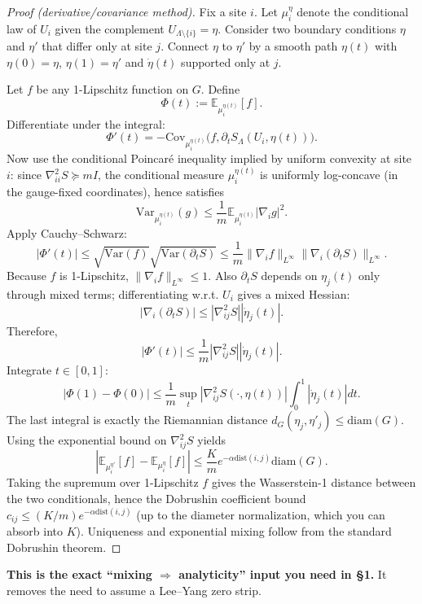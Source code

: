 \begin{proof}[Proof (derivative/covariance method)]
Fix a site $i$. Let $\mu_i^{\eta}$ denote the conditional law of $U_i$ given the complement $U_{\Lambda\setminus\{i\}}=\eta$. Consider two boundary conditions $\eta$ and $\eta'$ that differ only at site $j$. Connect $\eta$ to $\eta'$ by a smooth path $\eta(t)$ with $\eta(0)=\eta$, $\eta(1)=\eta'$ and $\dot\eta(t)$ supported only at $j$.

Let $f$ be any 1-Lipschitz function on $G$. Define
\[
\Phi(t) := \mathbb E_{\mu_i^{\eta(t)}}[f].
\]
Differentiate under the integral:
\[
\Phi'(t) = -\mathrm{Cov}_{\mu_i^{\eta(t)}}\big(f,\partial_t S_\Lambda(U_i,\eta(t))\big).
\]
Now use the conditional Poincaré inequality implied by uniform convexity at site $i$: since $\nabla^2_{ii}S \succeq m I$, the conditional measure $\mu_i^{\eta(t)}$ is uniformly log-concave (in the gauge-fixed coordinates), hence satisfies
\[
\mathrm{Var}_{\mu_i^{\eta(t)}}(g) \le \frac{1}{m}\mathbb E_{\mu_i^{\eta(t)}}|\nabla_i g|^2.
\]
Apply Cauchy--Schwarz:
\[
|\Phi'(t)| \le \sqrt{\mathrm{Var}(f)}\sqrt{\mathrm{Var}(\partial_t S)}
\le \frac{1}{m}\|\nabla_i f\|_{L^\infty}\|\nabla_i(\partial_t S)\|_{L^\infty}.
\]
Because $f$ is 1-Lipschitz, $\|\nabla_i f\|_{L^\infty}\le 1$. Also $\partial_t S$ depends on $\eta_j(t)$ only through mixed terms; differentiating w.r.t. $U_i$ gives a mixed Hessian:
\[
|\nabla_i(\partial_t S)| \le |\nabla^2_{ij} S||\dot\eta_j(t)|.
\]
Therefore,
\[
|\Phi'(t)| \le \frac{1}{m}|\nabla^2_{ij}S||\dot\eta_j(t)|.
\]
Integrate $t\in[0,1]$:
\[
|\Phi(1)-\Phi(0)| \le \frac{1}{m}\sup_t |\nabla^2_{ij}S(\cdot,\eta(t))| \int_0^1|\dot\eta_j(t)|dt.
\]
The last integral is exactly the Riemannian distance $d_G(\eta_j,\eta'_j)\le \mathrm{diam}(G)$. Using the exponential bound on $\nabla^2_{ij}S$ yields
\[
|\mathbb E_{\mu_i^{\eta'}}[f]-\mathbb E_{\mu_i^{\eta}}[f]|
\le \frac{K}{m}e^{-\alpha\mathrm{dist}(i,j)}\mathrm{diam}(G).
\]
Taking the supremum over 1-Lipschitz $f$ gives the Wasserstein-1 distance between the two conditionals, hence the Dobrushin coefficient bound $c_{ij}\le (K/m)e^{-\alpha \mathrm{dist}(i,j)}$ (up to the diameter normalization, which you can absorb into $K$). Uniqueness and exponential mixing follow from the standard Dobrushin theorem.
\end{proof}

\textbf{This is the exact ``mixing $\Rightarrow$ analyticity'' input you need in \S1.} It removes the need to assume a Lee--Yang zero strip.



